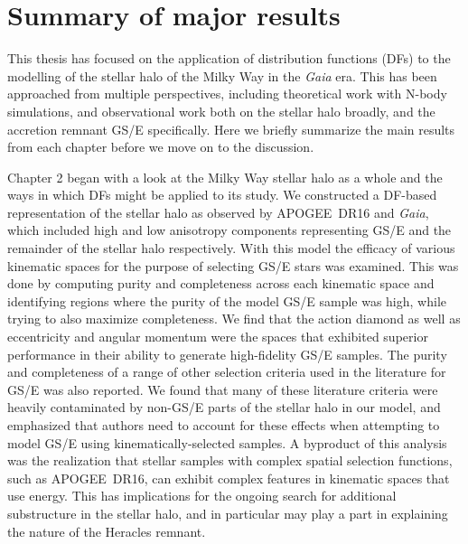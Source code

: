 \section{Summary of major results}

This thesis has focused on the application of distribution functions (DFs) to the modelling of the stellar halo of the Milky Way in the \textit{Gaia} era. This has been approached from multiple perspectives, including theoretical work with N-body simulations, and observational work both on the stellar halo broadly, and the accretion remnant GS/E specifically. Here we briefly summarize the main results from each chapter before we move on to the discussion.

Chapter 2 began with a look at the Milky Way stellar halo as a whole and the ways in which DFs might be applied to its study. We constructed a DF-based representation of the stellar halo as observed by APOGEE~DR16 and \textit{Gaia}, which included high and low anisotropy components representing GS/E and the remainder of the stellar halo respectively. With this model the efficacy of various kinematic spaces for the purpose of selecting GS/E stars was examined. This was done by computing purity and completeness across each kinematic space and identifying regions where the purity of the model GS/E sample was high, while trying to also maximize completeness. We find that the action diamond as well as eccentricity and angular momentum were the spaces that exhibited superior performance in their ability to generate high-fidelity GS/E samples. The purity and completeness of a range of other selection criteria used in the literature for GS/E was also reported. We found that many of these literature criteria were heavily contaminated by non-GS/E parts of the stellar halo in our model, and emphasized that authors need to account for these effects when attempting to model GS/E using kinematically-selected samples. A byproduct of this analysis was the realization that stellar samples with complex spatial selection functions, such as APOGEE~DR16, can exhibit complex features in kinematic spaces that use energy. This has implications for the ongoing search for additional substructure in the stellar halo, and in particular may play a part in explaining the nature of the Heracles remnant. 

